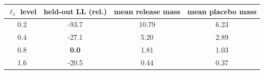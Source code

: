 \begin{tabular}{cccc}
\toprule
$\ell_1$ level & held-out LL (rel.) & mean release mass & mean placebo mass \\
\midrule
0.2 & {-93.7} & 10.79 & 6.23 \\
0.4 & {-27.1} & 5.20 & 2.89 \\
0.8 & \textbf{0.0} & 1.81 & 1.03 \\
1.6 & {-20.5} & 0.44 & 0.37 \\
\bottomrule
\end{tabular}